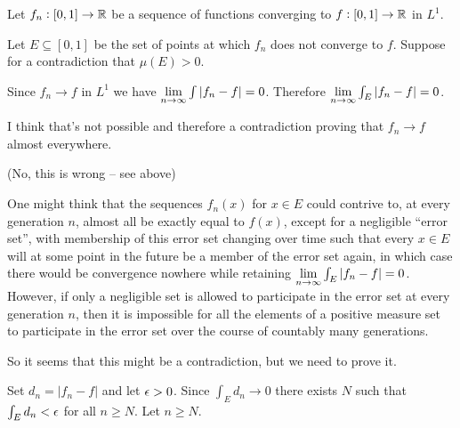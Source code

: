 
Let $f_n: [0, 1] \to \mathbb{R}$ be a sequence of functions converging to $f: [0, 1] \to \mathbb{R}$ in $L^1$.

Let $E \subseteq [0, 1]$ be the set of points at which $f_n$ does not converge to $f$. Suppose for a
contradiction that $\mu(E) > 0$.

Since $f_n \to f$ in $L^1$ we have $\limninf \int |f_n - f| = 0$. Therefore $\limninf \int_E |f_n - f| = 0$.

I think that's not possible and therefore a contradiction proving that $f_n \to f$ almost everywhere.

(No, this is wrong -- see above)

One might think that the sequences $f_n(x)$ for $x \in E$ could contrive to, at every
generation $n$, almost all be exactly equal to $f(x)$, except for a negligible ``error set​'', with
membership of this error set changing over time such that every $x \in E$ will at some point in the
future be a member of the error set again, in which case there would be convergence nowhere while
retaining $\limninf \int_E |f_n - f| = 0$. However, if only a negligible set is allowed to
participate in the error set at every generation $n$, then it is impossible for all the elements of
a positive measure set to participate in the error set over the course of countably many
generations.

So it seems that this might be a contradiction, but we need to prove it.

Set $d_n = |f_n - f|$ and let $\epsilon > 0$. Since $\int_E d_n \to 0$ there exists $N$ such
that $\int_E d_n < \epsilon$ for all $n \geq N$. Let $n \geq N$. 



